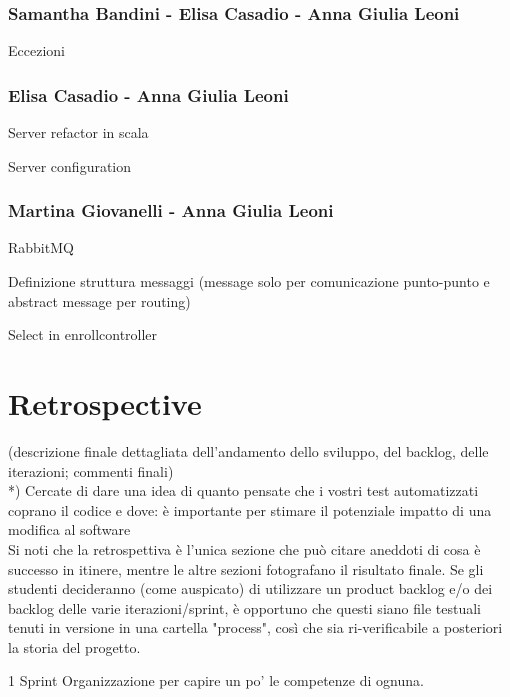 \documentclass[a4paper,12pt]{report}
\begin{document}
\subsection{Samantha Bandini - Elisa Casadio - Anna Giulia Leoni}
Eccezioni

\subsection{Elisa Casadio - Anna Giulia Leoni}
Server refactor in scala

Server configuration

\subsection{Martina Giovanelli - Anna Giulia Leoni}
RabbitMQ

Definizione struttura messaggi (message solo per comunicazione punto-punto e abstract message per routing)

Select in enrollcontroller


\chapter{Retrospective}

(descrizione finale dettagliata dell'andamento dello sviluppo, del backlog, delle iterazioni; commenti finali)\\

*) Cercate di dare una idea di quanto pensate che i vostri test automatizzati coprano il codice e dove: è importante per stimare il potenziale impatto di una modifica al software\\


Si noti che la retrospettiva è l'unica sezione che può citare aneddoti di cosa è successo in itinere, mentre le altre sezioni fotografano il risultato finale. Se gli studenti decideranno (come auspicato) di utilizzare un product backlog e/o dei backlog delle varie iterazioni/sprint, è opportuno che questi siano file testuali tenuti in versione in una cartella "process", così che sia ri-verificabile a posteriori la storia del progetto.

1 Sprint
Organizzazione per capire un po’ le competenze di ognuna.
\end{document}
